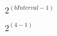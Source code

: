 \documentclass{article}
\begin{document}
$ 2^(bInterval-1) $
\pagebreak

$ 2^(4-1) $
\pagebreak
\end{document}
